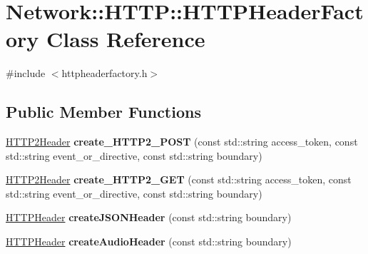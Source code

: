 \hypertarget{classNetwork_1_1HTTP_1_1HTTPHeaderFactory}{}\section{Network\+:\+:H\+T\+TP\+:\+:H\+T\+T\+P\+Header\+Factory Class Reference}
\label{classNetwork_1_1HTTP_1_1HTTPHeaderFactory}


{\ttfamily \#include $<$httpheaderfactory.\+h$>$}

\subsection*{Public Member Functions}
\begin{DoxyCompactItemize}
\item 
\mbox{\label{classNetwork_1_1HTTP_1_1HTTPHeaderFactory_a30385586c595933a3c52346c9e163c62}} 
\hyperlink{classNetwork_1_1HTTP_1_1HTTP2Header}{H\+T\+T\+P2\+Header} {\bfseries create\+\_\+\+H\+T\+T\+P2\+\_\+\+P\+O\+ST} (const std\+::string access\+\_\+token, const std\+::string event\+\_\+or\+\_\+directive, const std\+::string boundary)
\item 
\mbox{\label{classNetwork_1_1HTTP_1_1HTTPHeaderFactory_afd3427b234d82b0643bc08ccf5005154}} 
\hyperlink{classNetwork_1_1HTTP_1_1HTTP2Header}{H\+T\+T\+P2\+Header} {\bfseries create\+\_\+\+H\+T\+T\+P2\+\_\+\+G\+ET} (const std\+::string access\+\_\+token, const std\+::string event\+\_\+or\+\_\+directive, const std\+::string boundary)
\item 
\mbox{\label{classNetwork_1_1HTTP_1_1HTTPHeaderFactory_a821eedb7ff87430758fd564cbb583a97}} 
\hyperlink{classNetwork_1_1HTTP_1_1HTTPHeader}{H\+T\+T\+P\+Header} {\bfseries create\+J\+S\+O\+N\+Header} (const std\+::string boundary)
\item 
\mbox{\label{classNetwork_1_1HTTP_1_1HTTPHeaderFactory_a9954b144b199480ab53dfcb4c9a1c717}} 
\hyperlink{classNetwork_1_1HTTP_1_1HTTPHeader}{H\+T\+T\+P\+Header} {\bfseries create\+Audio\+Header} (const std\+::string boundary)
\end{DoxyCompactItemize}
